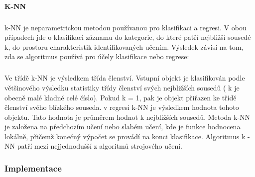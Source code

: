 \documentclass[a4paper,12pt]{article}
\begin{document}
\paragraph{K-NN}
\subparagraph*{}
k-NN je neparametrickou metodou používanou pro klasifikaci a regresi. V obou případech jde o klasifikaci záznamu do kategorie, do které patří nejbližší sousedé k, do prostoru charakteristik identifikovaných učením. Výsledek závisí na tom, zda se algoritmus používá pro účely klasifikace nebo regrese:
\subparagraph*{}
Ve třídě k-NN je výsledkem třída členství. Vstupní objekt je klasifikován podle většinového výsledku statistiky třídy členství svých nejbližších sousedů ( k je obecně malé kladné celé číslo). Pokud k = 1, pak je objekt přiřazen ke třídě členství svého blízkého souseda.
v regresi k-NN je výsledkem hodnota tohoto objektu. Tato hodnota je průměrem hodnot k nejbližších sousedů.
Metoda k-NN je založena na předchozím učení nebo slabém učení, kde je funkce hodnocena lokálně, přičemž konečný výpočet se provádí na konci klasifikace. Algoritmus k -NN patří mezi nejjednodušší z algoritmů strojového učení.

\pagebreak
\subsubsection{Implementace}
\end{document}
